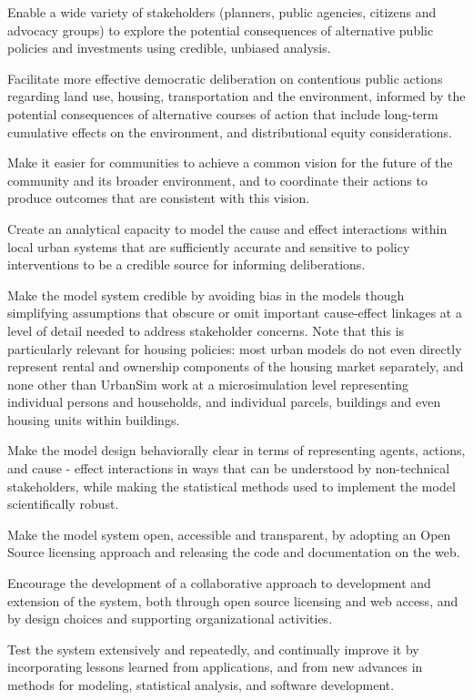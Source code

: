 \bigskip
\squishlist
\item Enable a wide variety of stakeholders (planners, public agencies, citizens and advocacy groups) to explore the potential consequences of alternative public policies and investments using credible, unbiased analysis.
\item Facilitate more effective democratic deliberation on contentious public actions regarding land use, housing, transportation and the environment, informed by the potential consequences of alternative courses of action that include long-term cumulative effects on the environment, and distributional equity considerations.
\item Make it easier for communities to achieve a common vision for the future of the community and its broader environment, and to coordinate their actions to produce outcomes that are consistent with this vision.
\item Create an analytical capacity to model the cause and effect interactions within local urban systems that are sufficiently accurate and sensitive to policy interventions to be a credible source for informing deliberations.
\item Make the model system credible by avoiding bias in the models though simplifying assumptions that obscure or omit important cause-effect linkages at a level of detail needed to address stakeholder concerns. Note that this is particularly relevant for housing policies: most urban models do not even directly represent rental and ownership components of the housing market separately, and none other than UrbanSim work at a microsimulation level representing individual persons and households, and individual parcels, buildings and even housing units within buildings.
\item Make the model design behaviorally clear in terms of representing agents, actions, and cause - effect interactions in ways that can be understood by non-technical stakeholders, while making the statistical methods used to implement the model scientifically robust.
\item Make the model system open, accessible and transparent, by adopting an Open Source licensing approach and releasing the code and documentation on the web.
\item Encourage the development of a collaborative approach to development and extension of the system, both through open source licensing and web access, and by design choices and supporting organizational activities.
\item Test the system extensively and repeatedly, and continually improve it by incorporating lessons learned from applications, and from new advances in methods for modeling, statistical analysis, and software development.
\squishend

